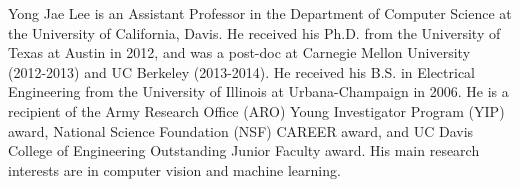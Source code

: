 \documentclass[10pt,journal,compsoc]{IEEEtran}
\begin{document}
\vspace{-20pt}
\begin{IEEEbiography}{Yong Jae Lee} is an Assistant Professor in the Department of Computer Science at the University of California, Davis. He received his Ph.D. from the University of Texas at Austin in 2012, and was a post-doc at Carnegie Mellon University (2012-2013) and UC Berkeley (2013-2014). He received his B.S. in Electrical Engineering from the University of Illinois at Urbana-Champaign in 2006. He is a recipient of the Army Research Office (ARO) Young Investigator Program (YIP) award, National Science Foundation (NSF) CAREER award, and UC Davis College of Engineering Outstanding Junior Faculty award.  His main research interests are in computer vision and machine learning.
\end{IEEEbiography}
\end{document}
